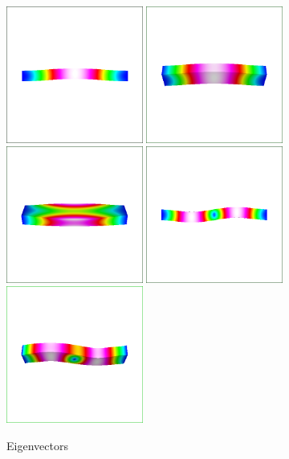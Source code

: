 \begin{figure}[h!]
\begin{center}
  \includegraphics[width=0.4\textwidth,angle=0]{eig1}
  \includegraphics[width=0.4\textwidth,angle=0]{eig2}
  \includegraphics[width=0.4\textwidth,angle=0]{eig3}
  \includegraphics[width=0.4\textwidth,angle=0]{eig4}
  \includegraphics[width=0.4\textwidth,angle=0]{eig5}
  \caption{Eigenvectors}
  \label{fig:eig12345}
\end{center}
\end{figure}

\vfill